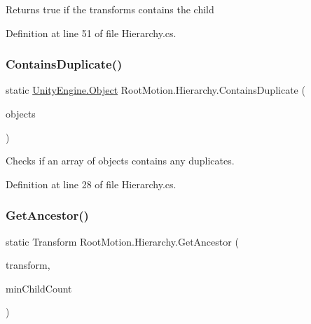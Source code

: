 Returns true if the transforms contains the child 



Definition at line 51 of file Hierarchy.\+cs.

\mbox{\label{class_root_motion_1_1_hierarchy_af2ea02433308f78f5bda023a801332d1}} 
\subsubsection{\texorpdfstring{Contains\+Duplicate()}{ContainsDuplicate()}}
{\footnotesize\ttfamily static \mbox{\hyperlink{_triangles_8cs_aef19bab18b9814edeef255c43e4f6bbc}{Unity\+Engine.\+Object}} Root\+Motion.\+Hierarchy.\+Contains\+Duplicate (\begin{DoxyParamCaption}\item[{\mbox{\hyperlink{_triangles_8cs_aef19bab18b9814edeef255c43e4f6bbc}{Unity\+Engine.\+Object}} \mbox{[}$\,$\mbox{]}}]{objects }\end{DoxyParamCaption})\hspace{0.3cm}{\ttfamily [static]}}



Checks if an array of objects contains any duplicates. 



Definition at line 28 of file Hierarchy.\+cs.

\mbox{\label{class_root_motion_1_1_hierarchy_a2ef812253318215efaed1be5453f2f25}} 
\subsubsection{\texorpdfstring{Get\+Ancestor()}{GetAncestor()}}
{\footnotesize\ttfamily static Transform Root\+Motion.\+Hierarchy.\+Get\+Ancestor (\begin{DoxyParamCaption}\item[{Transform}]{transform,  }\item[{int}]{min\+Child\+Count }\end{DoxyParamCaption})\hspace{0.3cm}{\ttfamily [static]}}



